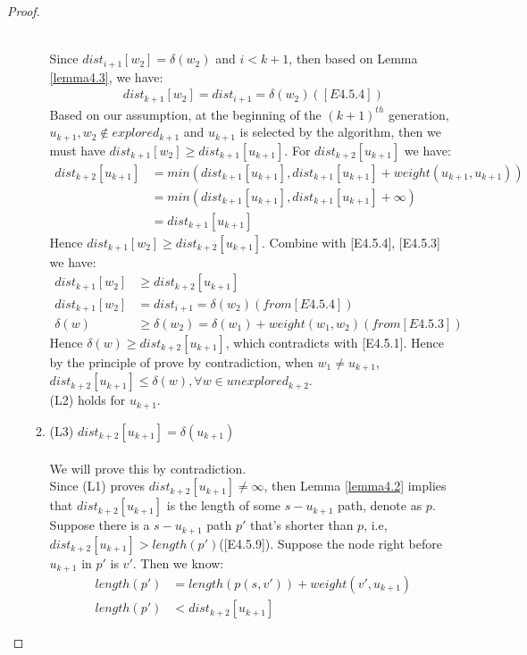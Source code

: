 \begin{proof}
\begin{itemize}
\begin{enumerate}
  \\
  Since $dist_{i+1}[w_2] = \delta(w_2)$ and $i < k+1$, then based on Lemma \ref{lemma4.3}, we have:
  \begin{align*}
  dist_{k+1}[w_2] = dist_{i+1} = \delta(w_2) ([E4.5.4])
  \end{align*}
  Based on our assumption, at the beginning of the $(k+1)^{th}$ generation, $u_{k+1}, w_2 \notin explored_{k+1}$ and $u_{k+1}$ is selected by the algorithm, then we must have $dist_{k+1}[w_2] \geq dist_{k+1}[u_{k+1}]$. For $dist_{k+2}[u_{k+1}]$ we have: 
  \begin{align*}
  dist_{k+2}[u_{k+1}] &= min(dist_{k+1}[u_{k+1}], dist_{k+1}[u_{k+1}] + weight(u_{k+1}, u_{k+1})) \\
                      &= min(dist_{k+1}[u_{k+1}], dist_{k+1}[u_{k+1}] + \infty) \\
                      &= dist_{k+1}[u_{k+1}] 
  \end{align*}
  Hence $dist_{k+1}[w_2] \geq dist_{k+2}[u_{k+1}]$. Combine with [E4.5.4], [E4.5.3] we have: 
  \begin{align*}
    dist_{k+1}[w_2] &\geq dist_{k+2}[u_{k+1}] \\
    dist_{k+1}[w_2] &= dist_{i+1} = \delta(w_2) (from [E4.5.4]) \\
    \delta(w) &\geq \delta(w_2) = \delta(w_1) + weight(w_1, w_2)(from [E4.5.3])
  \end{align*}
  Hence $\delta(w) \geq dist_{k+2}[u_{k+1}]$, which contradicts with [E4.5.1]. Hence by the principle of prove by contradiction, when $w_1 \neq u_{k+1}$, $dist_{k+2}[u_{k+1}] \leq \delta(w), \forall w \in unexplored_{k+2}$. 
  \\
  (L2) holds for $u_{k+1}$. 
  \\
  \item (L3) $dist_{k+2}[u_{k+1}] = \delta(u_{k+1})$
  \\\\
  We will prove this by contradiction. 
  \\
  Since (L1) proves $dist_{k+2}[u_{k+1}] \neq \infty$, then Lemma \ref{lemma4.2} implies that $dist_{k+2}[u_{k+1}]$ is the length of some $s-u_{k+1}$ path, denote as $p$. Suppose there is a $s-u_{k+1}$ path $p'$ that's shorter than $p$, i.e, $dist_{k+2}[u_{k+1}] > length(p')$([E4.5.9]). Suppose the node right before $u_{k+1}$ in $p'$ is $v'$. Then we know: 
  \begin{align*}
  length(p') &= length(p(s, v')) + weight(v', u_{k+1}) \\
  length(p') &< dist_{k+2}[u_{k+1}]

\end{align*}
\end{enumerate}
\end{itemize}
\end{proof}

